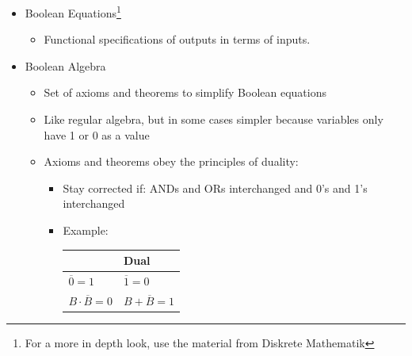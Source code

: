 \documentclass[a4paper]{article}
\begin{document}
\begin{itemize}
\begin{itemize}
\end{itemize}
\item Boolean Equations\footnote{For a more in depth look, use the material from Diskrete Mathematik}
\begin{itemize}
\item Functional specifications of outputs in terms of inputs.
\end{itemize}
\item Boolean Algebra
\begin{itemize}
\item Set of axioms and theorems to simplify Boolean equations
\item Like regular algebra, but in some cases simpler because variables only have 1 or 0 as a value
\item Axioms and theorems obey the principles of duality:
\begin{itemize}
\item Stay corrected if: ANDs and ORs interchanged and 0's and 1's interchanged
\item Example:\\
\begin{tabular}{l|l}
{}&Dual\\\hline
$\overline{0}=1$&$\overline{1}=0$\\
$B\cdot\overline{B}=0$&$B+\overline{B}=1$
\end{tabular}


\end{itemize}
\end{itemize}
\end{itemize}
\end{document}
